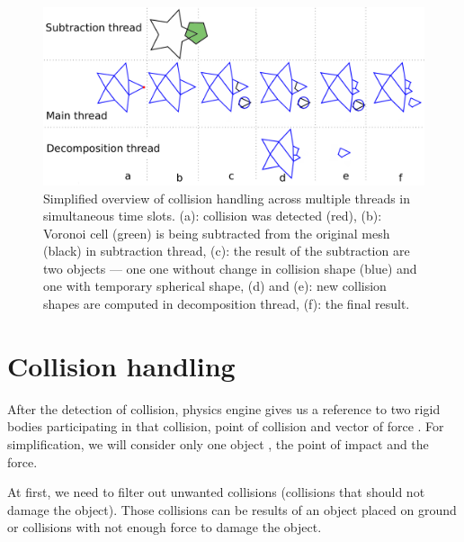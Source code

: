 \begin{figure}
        \centering
        \includegraphics[width=\textwidth]{img/object-progress}
        \caption{Simplified overview of collision handling across multiple threads in simultaneous time slots. (a): collision was detected (red), (b): Voronoi cell (green) is being subtracted from the original mesh (black) in subtraction thread, (c): the result of the subtraction are two objects --- one one without change in collision shape (blue) and one with temporary spherical shape, (d) and (e): new collision shapes are computed in decomposition thread, (f): the final result.}
        \label{fig:objectInThreads}
\end{figure}

\section{Collision handling}
\label{sec:collisions}
After the detection of collision, physics engine gives us a reference to two rigid bodies participating in that collision, point of collision and vector of force . For simplification, we will consider only one object , the point of impact and the force.

At first, we need to filter out unwanted collisions (collisions that should not damage the object). Those collisions can be results of an object placed on ground or collisions with not enough force to damage the object. 

